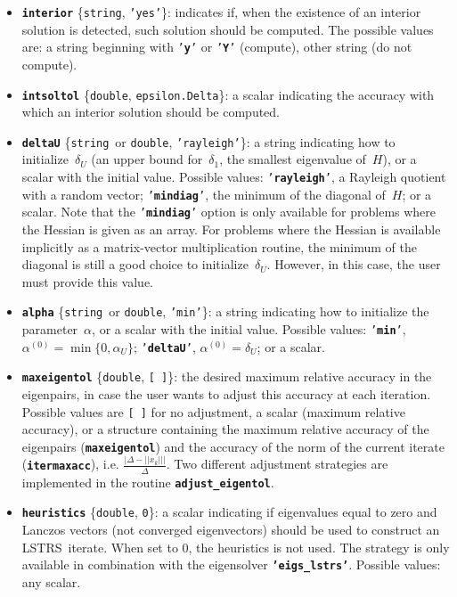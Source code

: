 \documentclass[acmtoms]{acmtrans2m}
\newcommand{\double}{{\tt double}}
\newcommand{\mstring}{{\tt string}}
\newcommand{\rad}{{\Delta}}
\newcommand{\alphaU}{\alpha_{\scriptscriptstyle U}}
\newcommand{\deltao}{\delta_{1}}
\newcommand{\deltaU}{\delta_{\scriptscriptstyle U}}
\newcommand{\alphaz}{\alpha^{(0)}}
\newcommand{\mlstrs}{LSTRS}
\newcommand{\hessian}{H}
\begin{document}
\begin{enumerate}
\begin{itemize}
any other string (do not add).
\item {\tt\bf interior} \{\mstring, {\tt 'yes'}\}: indicates if, when the existence
of an interior solution is detected, such solution should be computed.
The possible values are: 
a string beginning with {\tt'{\bf y}'} or {\tt'{\bf Y}'} (compute), other
string (do not compute).
\item {\tt\bf intsoltol} \{\double, {\tt epsilon.Delta}\}: a scalar indicating
the accuracy with which an interior solution should be computed.
\item {\tt\bf deltaU} \{\mstring\ or \double, {\tt 'rayleigh'}\}: a string indicating how to
initialize\ $\deltaU$ (an upper bound for\ $\deltao$, the smallest eigenvalue of\ $\hessian$), or a scalar with the initial value.
Possible values: {\tt'{\bf rayleigh}'}, a Rayleigh quotient with a random vector;
{\tt'{\bf mindiag}'}, the minimum of the diagonal of\ $\hessian$; or a scalar. 
Note that the {\tt'{\bf mindiag}'} option is only available for problems where the
Hessian is given as an array. For problems where the Hessian is available implicitly as
a matrix-vector multiplication routine, the minimum of the diagonal is still a good choice
to initialize\ $\deltaU$. However, in this case, the user must provide this value.
\item {\tt\bf alpha} \{\mstring\ or \double, {\tt 'min'}\}: a string indicating how to initialize the
parameter\ $\alpha$, or a scalar with the initial value.
Possible values: {\tt'{\bf min}'}, $\alphaz = \min\{0,\alphaU\}$;
{\tt'{\bf deltaU}'}, $\alphaz = \deltaU$; or a scalar.
\item {\tt\bf maxeigentol} \{\double, {\tt [\ ]}\}: the desired maximum relative accuracy
in the eigenpairs, in case the user wants to adjust this accuracy
at each iteration. Possible values are {\tt [\ ]} for no adjustment,
a scalar (maximum relative accuracy),
or a structure containing the maximum relative accuracy of the eigenpairs
({\tt\bf maxeigentol}) and the accuracy of the norm of the current iterate
({\tt\bf itermaxacc}), i.e. $\frac{| \rad - ||x_k|| |}{\rad}$.
Two different adjustment strategies are implemented in the routine
{\tt\bf adjust\_eigentol}.

\item {\tt\bf heuristics} \{\double, {\tt 0}\}: a scalar indicating
if eigenvalues equal to zero and Lanczos vectors (not converged eigenvectors)
should be used to construct an \mlstrs\ iterate. When set to 0, the heuristics
is not used. The strategy is only available in combination with the
eigensolver {\tt\bf 'eigs\_lstrs'}. Possible values: any scalar.
\end{itemize}


\end{enumerate}
\end{document}
